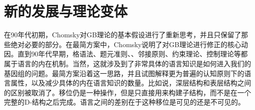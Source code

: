 \section{新的发展与理论变体}
\label{Abschnitt-neues-GB}

在90年代初期，Chomsky对GB理论的基本假设进行了重新思考，并且只保留了那些绝对必要的部分。在最简方案中，Chomsky说明了对GB理论进行修正的核心动因\citep{Chomsky93b-u,Chomsky95a-u}。直到90年代早期，格语法、题元准则、\xbartc、邻接原则、约束理论、控制理论等都属于语言的内在机制\citep[]{Richards2015a}。当然，这就涉及到了非常具体的语言知识是如何进入我们的基因组的问题。最简方案沿着这一思路，并且试图解释更为普遍的认知原则下的语言属性，以及减少具体的内在语言知识的数量。比如说，深层结构和表层结构之间的区别被取消了。移位仍是一种操作，但是只直接用来构建子结构，而不是在一个完整的D-结构之后完成。语言之间的差别在于这种移位是可见的还是不可见的。

